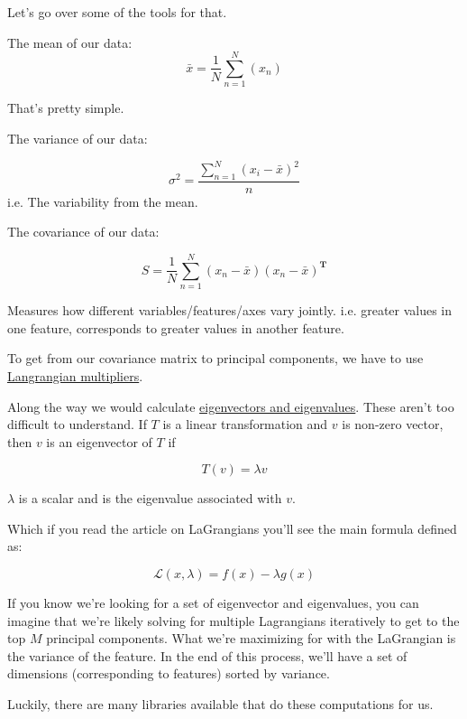 \documentclass[letterpaper,12pt]{article}
\begin{document}
Let's go over some of the tools for that.

The mean of our data:
\[
    \bar{x} = \frac{1}{N}\sum_{n=1}^{N}(x_n)
\]

That's pretty simple.

The variance of our data:

\[
    \sigma^2 = \frac{\sum_{n=1}^{N} (x_i - \bar{x})^2}{n}
\]
i.e. The variability from the mean.

The covariance of our data:

\[
    S = \frac{1}{N} \sum_{n=1}^{N} (x_n - \bar{x})(x_n - \bar{x})^{\textbf{T}}
\]

Measures how different variables/features/axes vary jointly. i.e. greater values
in one feature, corresponds to greater values in another feature.

To get from our covariance matrix to principal components, we have to use
\href{https://en.wikipedia.org/wiki/Lagrange_multiplier}{Langrangian
multipliers}.

Along the way we would calculate \href{https://en.wikipedia.org/wiki/Eigenvalues_and_eigenvectors}{eigenvectors and eigenvalues}.
These aren't too difficult to understand. If $T$ is a linear transformation and
$v$ is non-zero vector, then $v$ is an eigenvector of $T$ if

\[
    T(v) = \lambda v
\]

$\lambda$ is a scalar and is the eigenvalue associated with $v$.

Which if you read the article on LaGrangians you'll see the main formula defined
as:

\[
    \mathcal{L}(x, \lambda) = f(x) - \lambda g(x)
\]

If you know we're looking for a set of eigenvector and eigenvalues, you can imagine
that we're likely solving for multiple Lagrangians iteratively to get to the top
$M$ principal components. What we're maximizing for with the LaGrangian is the
variance of the feature. In the end of this process, we'll have a set of
dimensions (corresponding to features) sorted by variance.

Luckily, there are many libraries available that do these computations for us.
\end{document}
